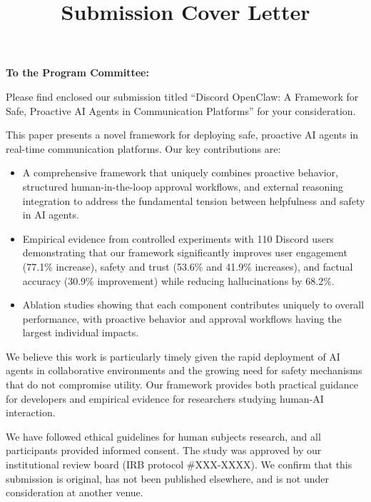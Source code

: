 \documentclass[11pt]{article}
\title{Submission Cover Letter}
\author{}
\date{}
\begin{document}
\maketitle

\noindent\textbf{To the Program Committee:}

\vspace{0.5cm}

\noindent Please find enclosed our submission titled ``Discord OpenClaw: A Framework for Safe, Proactive AI Agents in Communication Platforms'' for your consideration.

\vspace{0.5cm}

\noindent This paper presents a novel framework for deploying safe, proactive AI agents in real-time communication platforms. Our key contributions are:

\begin{itemize}
    \item A comprehensive framework that uniquely combines proactive behavior, structured human-in-the-loop approval workflows, and external reasoning integration to address the fundamental tension between helpfulness and safety in AI agents.
    
    \item Empirical evidence from controlled experiments with 110 Discord users demonstrating that our framework significantly improves user engagement (77.1\% increase), safety and trust (53.6\% and 41.9\% increases), and factual accuracy (30.9\% improvement) while reducing hallucinations by 68.2\%.
    
    \item Ablation studies showing that each component contributes uniquely to overall performance, with proactive behavior and approval workflows having the largest individual impacts.
\end{itemize}

\vspace{0.5cm}

\noindent We believe this work is particularly timely given the rapid deployment of AI agents in collaborative environments and the growing need for safety mechanisms that do not compromise utility. Our framework provides both practical guidance for developers and empirical evidence for researchers studying human-AI interaction.

\vspace{0.5cm}

\noindent We have followed ethical guidelines for human subjects research, and all participants provided informed consent. The study was approved by our institutional review board (IRB protocol \#XXX-XXXX). We confirm that this submission is original, has not been published elsewhere, and is not under consideration at another venue.
\end{document}
